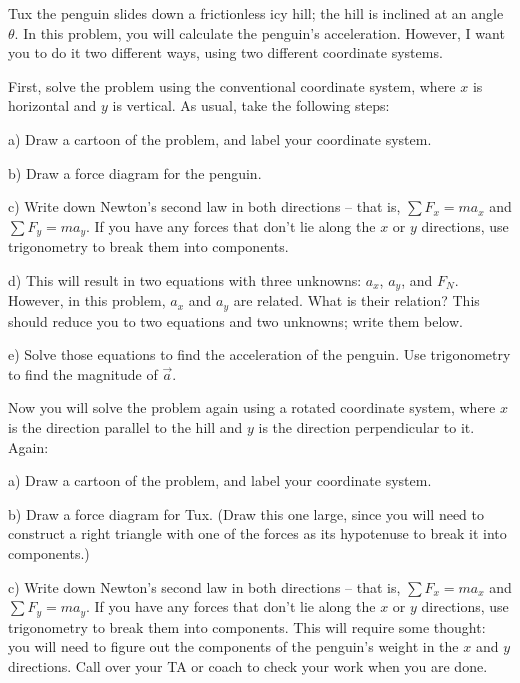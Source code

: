 \documentclass[12pt]{article}
\begin{document}
\Large
\centerline{}
\normalsize
\centerline{}

Tux the penguin slides down a frictionless icy hill; the hill is inclined at an angle $\theta$. In this problem, you will 
calculate the penguin's acceleration. However, I want you to do it two different ways, using two different coordinate systems.

First, solve the problem using the conventional coordinate system, where $x$ is horizontal and $y$ is vertical. As usual, take the following steps:

a) Draw a cartoon of the problem, and label your coordinate system.

\vspace{2in}


b) Draw a force diagram for the penguin. 

\vspace{2in}

c) Write down Newton's second law in both directions -- that is, $\sum F_x = ma_x$ and $\sum F_y = ma_y$. If you have any forces that don't lie along the $x$ or $y$ directions, use trigonometry to break them into components.

\vspace{2in}
\newpage
d) This will result in two equations with three unknowns: $a_x$, $a_y$, and $F_N$. However, in this problem, $a_x$ and $a_y$ are related. What is their relation? This should reduce you to two equations and two unknowns; write them below.
\vspace{3in}

e) Solve those equations to find the acceleration of the penguin. Use trigonometry to find the magnitude of $\vec a$.

\newpage
Now you will solve the problem again using a rotated coordinate system, where $x$ is the direction parallel to the hill and $y$ is the direction perpendicular to it. Again:

a) Draw a cartoon of the problem, and label your coordinate system. 

\vspace{2in}

b) Draw a force diagram for Tux. (Draw this one large, since you will need to construct a right triangle 
with one of the forces as its hypotenuse to break it into components.) 

\vspace{3in}

c) Write down Newton's second law in both directions -- that is, $\sum F_x = ma_x$ and $\sum F_y = ma_y$. 
If you have any forces that don't lie along the $x$ or $y$ directions, use trigonometry to break them into components.
This will require some thought: you will need to figure out the components of the 
penguin's weight in the $x$ and $y$ directions. Call over your TA or coach to check your work when you are done.
\end{document}

